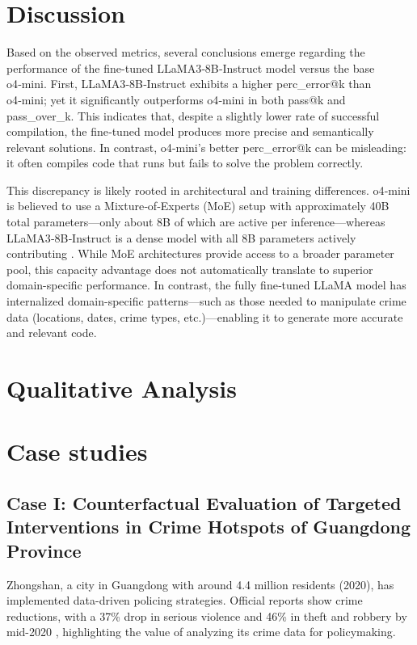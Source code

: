\section{Discussion}

Based on the observed metrics, several conclusions emerge regarding the performance of the fine-tuned LLaMA3‑8B‑Instruct model versus the base o4‑mini. First, LLaMA3‑8B‑Instruct exhibits a higher perc\_error@k than o4‑mini; yet it significantly outperforms o4‑mini in both pass@k and pass\_over\_k. This indicates that, despite a slightly lower rate of successful compilation, the fine‑tuned model produces more precise and semantically relevant solutions. In contrast, o4‑mini’s better perc\_error@k can be misleading: it often compiles code that runs but fails to solve the problem correctly.

This discrepancy is likely rooted in architectural and training differences. o4‑mini is believed to use a Mixture‑of‑Experts (MoE) setup with approximately 40B total parameters—only about 8B of which are active per inference—whereas LLaMA3‑8B‑Instruct is a dense model with all 8B parameters actively contributing . While MoE architectures provide access to a broader parameter pool, this capacity advantage does not automatically translate to superior domain-specific performance. In contrast, the fully fine‑tuned LLaMA model has internalized domain-specific patterns—such as those needed to manipulate crime data (locations, dates, crime types, etc.)—enabling it to generate more accurate and relevant code.
\section{Qualitative Analysis}


\section{Case studies}

\subsection{Case I: Counterfactual Evaluation of Targeted Interventions in Crime Hotspots of Guangdong Province}

Zhongshan, a city in Guangdong with around 4.4 million residents (2020), has implemented data-driven policing strategies. Official reports show crime reductions, with a 37\% drop in serious violence and 46\% in theft and robbery by mid-2020 \cite{Zhongshan2020}, highlighting the value of analyzing its crime data for policymaking.

